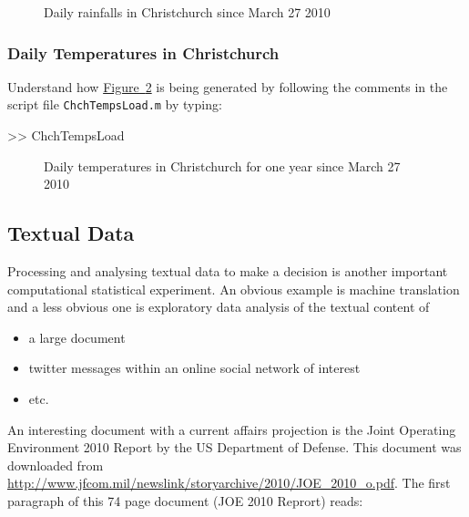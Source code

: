 \begin{figure}[htpb]
\caption{Daily rainfalls in Christchurch since March 27 2010 \label{F:ChchDailyRainfallSince}}
\centering   {}
\end{figure}

\subsubsection{Daily Temperatures in Christchurch}


\begin{labwork}\label{LW:ChchTempsLoad}
Understand how \hyperref[F:ChchTemps365DaysSince20100327]{Figure~\ref*{F:ChchTemps365DaysSince20100327}} is being generated by following the comments in the script file {\tt ChchTempsLoad.m} by typing:
\begin{VrbM}
>> ChchTempsLoad
\end{VrbM}
\end{labwork}

\begin{figure}[htpb]
\caption{Daily temperatures in Christchurch for one year since March 27 2010 \label{F:ChchTemps365DaysSince20100327}}
\centering   {}
\end{figure}

\subsection{Textual Data}

Processing and analysing textual data to make a decision is another important computational statistical experiment. An obvious example  is machine translation and a less obvious one is exploratory data analysis of the textual content of 
\begin{itemize}
\item a large document
\item twitter messages within an online social network of interest
\item etc.
\end{itemize}

An interesting document with a current affairs projection is the Joint Operating Environment 2010 Report by the US Department of Defense.  This document was downloaded from \href{http://www.jfcom.mil/newslink/storyarchive/2010/JOE_2010_o.pdf}{\url{http://www.jfcom.mil/newslink/storyarchive/2010/JOE_2010_o.pdf}}.  The first paragraph of this 74 page document (JOE 2010 Reprort) reads:

